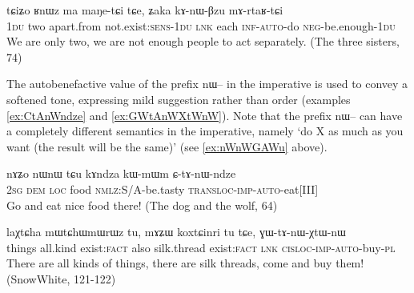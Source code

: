 \documentclass[oldfontcommands,oneside,a4paper,11pt]{article}
\newcommand{\ipa}[1]{{\phon \mbox{#1}}} %
\begin{document}
   \begin{exe}
\ex \label{ex:kAnWBzu.mArtaRtCi}
\gll
\ipa{tɕiʑo} 	\ipa{ʁnɯz} 	\ipa{ma} 	\ipa{maŋe-tɕi} 	\ipa{tɕe,} 	\ipa{ʑaka} 	\ipa{kɤ-nɯ-βzu} 	\ipa{mɤ-rtaʁ-tɕi} \\
\textsc{1du} two apart.from not.exist:\textsc{sens}-\textsc{1du} \textsc{lnk} each \textsc{inf-auto}-do \textsc{neg}-be.enough-\textsc{1du} \\
\glt We are only two, we are not enough people to act separately. (The three sisters, 74)
\end{exe} 

The autobenefactive value of the prefix \ipa{nɯ--}  in the imperative is used to convey a softened tone, expressing mild suggestion rather than order (examples \ref{ex:CtAnWndze} and \ref{ex:GWtAnWXtWnW}). Note that the prefix \ipa{nɯ--}  can have a completely different semantics in the imperative, namely `do X as much as you want (the result will be the same)' (see  \ref{ex:nWnWGAWu} above).

\begin{exe}
\ex \label{ex:CtAnWndze}
\gll
\ipa{nɤʑo} 	\ipa{nɯnɯ} \ipa{tɕu} 	\ipa{kɤndza} 	\ipa{kɯ-mɯm} 	\ipa{ɕ-tɤ-nɯ-ndze} \\
\textsc{2sg} \textsc{dem} \textsc{loc} food \textsc{nmlz}:S/A-be.tasty \textsc{transloc-imp-auto}-eat[III] \\
\glt Go and eat nice food there! (The dog and the wolf, 64)
\end{exe}

\begin{exe}
\ex \label{ex:GWtAnWXtWnW}
\gll
\ipa{laχtɕha} 	\ipa{mɯtɕhɯmɯrɯz} 	\ipa{tu,} 	\ipa{mɤʑɯ} 	\ipa{koxtɕinri} 	\ipa{tu} 	\ipa{tɕe,} 	\ipa{ɣɯ-tɤ-nɯ-χtɯ-nɯ} \\ 
things all.kind exist:\textsc{fact} also silk.thread exist:\textsc{fact} \textsc{lnk} \textsc{cisloc-imp-auto}-buy-\textsc{pl} \\
\glt There are all kinds of things, there are silk threads, come and buy them! (SnowWhite, 121-122)
\end{exe}

\end{document}

